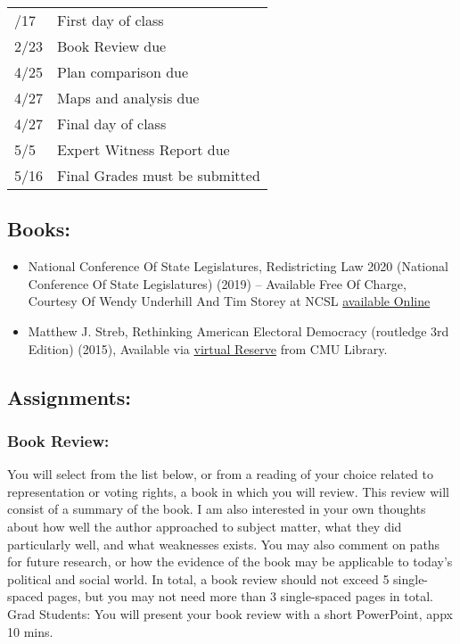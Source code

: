 \documentclass[
]{article}
\providecommand{\tightlist}{%
  \setlength{\itemsep}{0pt}\setlength{\parskip}{0pt}}
\begin{document}
\begin{longtable}[]{@{}ll@{}}
\toprule\noalign{}
\endhead
\bottomrule\noalign{}
\endlastfoot
1/17 & First day of class \\
2/23 & Book Review due \\
4/25 & Plan comparison due \\
4/27 & Maps and analysis due \\
4/27 & Final day of class \\
5/5 & Expert Witness Report due \\
5/16 & Final Grades must be submitted \\
\end{longtable}

\hypertarget{books}{%
\subsection{Books:}\label{books}}

\begin{itemize}
\tightlist
\item
  National Conference Of State Legislatures, Redistricting Law 2020
  (National Conference Of State Legislatures) (2019) -- Available Free
  Of Charge, Courtesy Of Wendy Underhill And Tim Storey at NCSL
  \href{https://drive.google.com/file/d/1iyicpt_qzig4ndwnxrcmfzr3mcqkkqzk/view?usp=sharing}{available
  Online}
\item
  Matthew J. Streb, Rethinking American Electoral Democracy (routledge
  3rd Edition) (2015), Available via
  \href{https://cmu.primo.exlibrisgroup.com/discovery/collectiondiscovery?vid=01cmu_inst:01cmu\&collectionid=81278879090004436}{virtual
  Reserve} from CMU Library.
\end{itemize}

\hypertarget{assignments}{%
\subsection{Assignments:}\label{assignments}}

\hypertarget{book-review}{%
\subsubsection{Book Review:}\label{book-review}}

You will select from the list below, or from a reading of your choice
related to representation or voting rights, a book in which you will
review. This review will consist of a summary of the book. I am also
interested in your own thoughts about how well the author approached to
subject matter, what they did particularly well, and what weaknesses
exists. You may also comment on paths for future research, or how the
evidence of the book may be applicable to today's political and social
world. In total, a book review should not exceed 5 single-spaced pages,
but you may not need more than 3 single-spaced pages in total. Grad
Students: You will present your book review with a short PowerPoint,
appx 10 mins.
\end{document}
